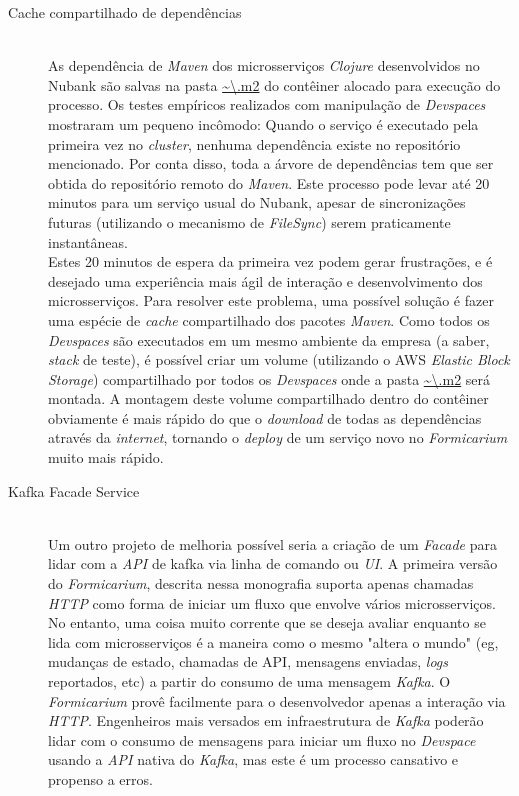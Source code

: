 	\begin{description}
  \item[Cache compartilhado de dependências]
  \hfill \\As dependência de \textit{Maven} dos microsserviços \textit{Clojure} desenvolvidos no Nubank são salvas na pasta \url{~\.m2} do contêiner alocado para execução do processo. Os testes empíricos realizados com manipulação de \textit{Devspaces} mostraram um pequeno incômodo: Quando o serviço é executado pela primeira vez no \textit{cluster}, nenhuma dependência existe no repositório mencionado. Por conta disso, toda a árvore de dependências tem que ser obtida do repositório remoto do \textit{Maven}. Este processo pode levar até 20 minutos para um serviço usual do Nubank, apesar de sincronizações futuras (utilizando o mecanismo de \textit{FileSync}) serem praticamente instantâneas.\\
  Estes 20 minutos de espera da primeira vez podem gerar frustrações, e é desejado uma experiência mais ágil de interação e desenvolvimento dos microsserviços. Para resolver este problema, uma possível solução é fazer uma espécie de \textit{cache} compartilhado dos pacotes \textit{Maven}. Como todos os \textit{Devspaces} são executados em um mesmo ambiente da empresa (a saber, \textit{stack} de teste), é possível criar um volume (utilizando o AWS \textit{Elastic Block Storage}) compartilhado por todos os \textit{Devspaces} onde a pasta \url{~\.m2} será montada. A montagem deste volume compartilhado dentro do contêiner obviamente é mais rápido do que o \textit{download} de todas as dependências através da \textit{internet}, tornando o \textit{deploy} de um serviço novo no \textit{Formicarium} muito mais rápido.
  \item[Kafka Facade Service]   
  \hfill \\Um outro projeto de melhoria possível seria a criação de um \textit{Facade} para lidar com a \textit{API} de kafka via linha de comando ou \textit{UI}. A primeira versão do \textit{Formicarium}, descrita nessa monografia suporta apenas chamadas \textit{HTTP} como forma de iniciar um fluxo que envolve vários microsserviços. No entanto, uma coisa muito corrente que se deseja avaliar enquanto se lida com microsserviços é a maneira como o mesmo "altera o mundo" (eg, mudanças de estado, chamadas de API, mensagens enviadas, \textit{logs} reportados, etc) a partir do consumo de uma mensagem \textit{Kafka}. O \textit{Formicarium} provê facilmente para o desenvolvedor apenas a interação via \textit{HTTP}. Engenheiros mais versados em infraestrutura de \textit{Kafka} poderão lidar com o consumo de mensagens para iniciar um fluxo no \textit{Devspace} usando a \textit{API} nativa do \textit{Kafka}, mas este é um processo cansativo e propenso a erros.\\

\end{description}
